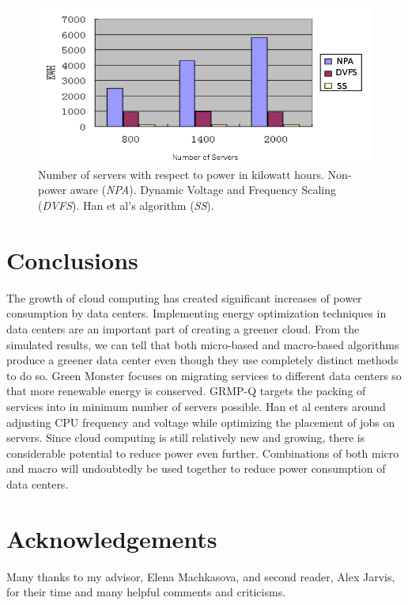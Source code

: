 \documentclass{sig-alternate}
\begin{document}

\begin{figure}[tb]
 \centering
 \includegraphics[height=0.24 \textwidth]{s4}
 \caption{Number of servers with respect to power in kilowatt hours. Non-power aware (\emph{NPA}). Dynamic Voltage and Frequency Scaling (\emph{DVFS}). Han et al's algorithm (\emph{SS}).}
 \label{fig:Results_SS}
\end{figure}

\section{Conclusions} 
\label{sec:conclusion}
The growth of cloud computing has created significant increases of power consumption by data centers. Implementing energy optimization techniques in data centers are an important part of creating a greener cloud. From the simulated results, we can tell that both micro-based and macro-based algorithms produce a greener data center even though they use completely distinct methods to do so. Green Monster focuses on migrating services to different data centers so that more renewable energy is conserved. GRMP-Q targets the packing of services into in minimum number of servers possible. Han et al centers around adjusting CPU frequency and voltage while optimizing the placement of jobs on servers. Since cloud computing is still relatively new and growing, there is considerable potential to reduce power even further. Combinations of both micro and macro will undoubtedly be used together to reduce power consumption of data centers.

\section*{Acknowledgements}

Many thanks to my advisor, Elena Machkasova, and second reader, Alex Jarvis, for their time and many helpful comments and criticisms. 



\end{document}
